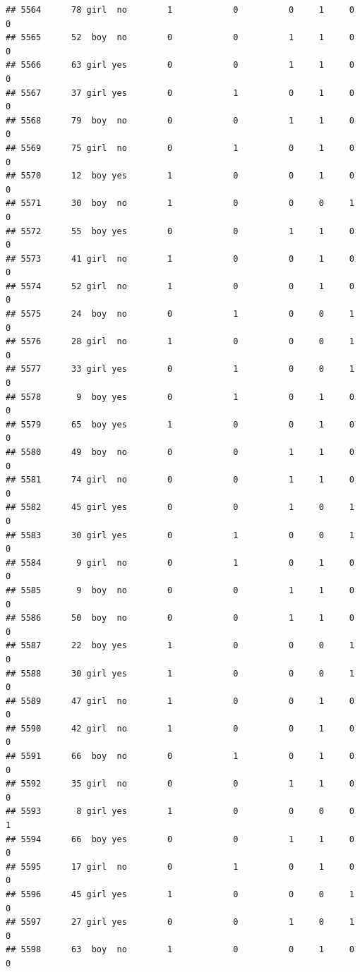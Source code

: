 \documentclass[man]{apa6}
\begin{document}
\begin{verbatim}
## 5564      78 girl  no        1            0          0     1     0     0
## 5565      52  boy  no        0            0          1     1     0     0
## 5566      63 girl yes        0            0          1     1     0     0
## 5567      37 girl yes        0            1          0     1     0     0
## 5568      79  boy  no        0            0          1     1     0     0
## 5569      75 girl  no        0            1          0     1     0     0
## 5570      12  boy yes        1            0          0     1     0     0
## 5571      30  boy  no        1            0          0     0     1     0
## 5572      55  boy yes        0            0          1     1     0     0
## 5573      41 girl  no        1            0          0     1     0     0
## 5574      52 girl  no        1            0          0     1     0     0
## 5575      24  boy  no        0            1          0     0     1     0
## 5576      28 girl  no        1            0          0     0     1     0
## 5577      33 girl yes        0            1          0     0     1     0
## 5578       9  boy yes        0            1          0     1     0     0
## 5579      65  boy yes        1            0          0     1     0     0
## 5580      49  boy  no        0            0          1     1     0     0
## 5581      74 girl  no        0            0          1     1     0     0
## 5582      45 girl yes        0            0          1     0     1     0
## 5583      30 girl yes        0            1          0     0     1     0
## 5584       9 girl  no        0            1          0     1     0     0
## 5585       9  boy  no        0            0          1     1     0     0
## 5586      50  boy  no        0            0          1     1     0     0
## 5587      22  boy yes        1            0          0     0     1     0
## 5588      30 girl yes        1            0          0     0     1     0
## 5589      47 girl  no        1            0          0     1     0     0
## 5590      42 girl  no        1            0          0     1     0     0
## 5591      66  boy  no        0            1          0     1     0     0
## 5592      35 girl  no        0            0          1     1     0     0
## 5593       8 girl yes        1            0          0     0     0     1
## 5594      66  boy yes        0            0          1     1     0     0
## 5595      17 girl  no        0            1          0     1     0     0
## 5596      45 girl yes        1            0          0     0     1     0
## 5597      27 girl yes        0            0          1     0     1     0
## 5598      63  boy  no        1            0          0     1     0     0

\end{verbatim}
\end{document}
